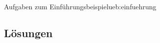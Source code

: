 \begin{ueb}{Aufgaben zum Einführungsbeispiel}{ueb:einfuehrung}
\begin{enumerate}
\begin{enumerate}
\begin{center}
                        \end{center}

              \end{enumerate}
    \end{enumerate}

\end{ueb}


\clearpage

\subsection*{Lösungen}

